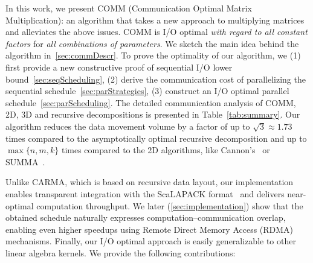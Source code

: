 \documentclass[sigplan,review,anonymous,10pt]{acmart}\settopmatter{printfolios=true,printccs=false,printacmref=false}
\newcommand\greg[1]{\textcolor{blue}{[Greg: #1]}}
\newcommand\mac[1]{\textcolor{red}{[Mac: #1]}}
\begin{document}
In this work, we present COMM (Communication Optimal Matrix Multiplication): 
an algorithm that takes a new approach to multiplying
matrices and alleviates the above issues. COMM is I/O optimal \emph{with regard 
to all constant factors}
for \emph{all combinations of parameters}. We sketch the main idea behind the 
algorithm in~\cref{sec:commDescr}.
%
To prove the optimality of our algorithm,  we (1) first provide a new 
constructive proof of sequential I/O lower bound~\cref{sec:seqScheduling},  (2) 
derive the communication cost of  
parallelizing the sequential
schedule~\cref{sec:parStrategies}, (3) construct an I/O optimal parallel 
schedule~\cref{sec:parScheduling}. 
The detailed communication analysis of COMM, 2D, 3D and 
recursive decompositions is
presented in Table~\ref{tab:summary}. Our algorithm reduces the data 
movement volume by a factor of up to $\sqrt{3} \approx 1.73$ times compared to 
the 
asymptotically optimal recursive decomposition and up to 
$\max\{n,m,k\}$ times compared to the 2D
algorithms, like Cannon's~\cite{generalCannon} or SUMMA~\cite{summa}.


Unlike CARMA, which is based on recursive data layout, our implementation
enables transparent integration with the ScaLAPACK
format~\cite{scalapackLayout} and delivers near-optimal computation throughput.
%
We later (\cref{sec:implementation}) show that the obtained schedule 
naturally expresses
computation--communication overlap, 
%
%
enabling even higher speedups
using Remote Direct Memory Access (RDMA) mechanisms.
%
%
Finally, our I/O optimal approach is
easily generalizable to other linear algebra kernels. 
%
We provide the following contributions:
\end{document}
